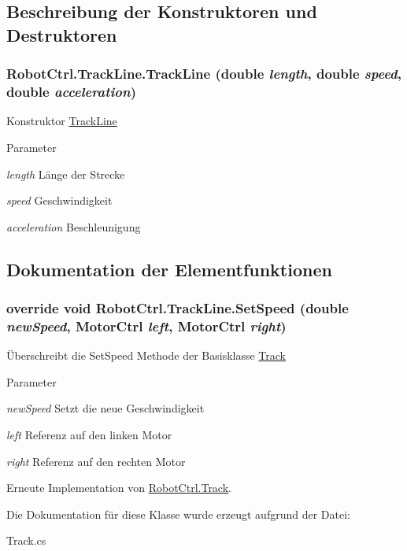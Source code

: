 \subsection{Beschreibung der Konstruktoren und Destruktoren}
\hypertarget{class_robot_ctrl_1_1_track_line_ab4ab93433f36792a4748322b94febfc7}{
\subsubsection[{TrackLine}]{\setlength{\rightskip}{0pt plus 5cm}RobotCtrl.TrackLine.TrackLine (double {\em length}, \/  double {\em speed}, \/  double {\em acceleration})}}
\label{class_robot_ctrl_1_1_track_line_ab4ab93433f36792a4748322b94febfc7}
Konstruktor \hyperlink{class_robot_ctrl_1_1_track_line}{TrackLine}


\begin{DoxyParams}{Parameter}
\item[{\em length}]L\"{a}nge der Strecke \item[{\em speed}]Geschwindigkeit \item[{\em acceleration}]Beschleunigung \end{DoxyParams}


\subsection{Dokumentation der Elementfunktionen}
\hypertarget{class_robot_ctrl_1_1_track_line_ad73ae0e8f7aea1765834ab90f5bd6b23}{
\subsubsection[{SetSpeed}]{\setlength{\rightskip}{0pt plus 5cm}override void RobotCtrl.TrackLine.SetSpeed (double {\em newSpeed}, \/  {\bf MotorCtrl} {\em left}, \/  {\bf MotorCtrl} {\em right})}}
\label{class_robot_ctrl_1_1_track_line_ad73ae0e8f7aea1765834ab90f5bd6b23}
\"{U}berschreibt die SetSpeed Methode der Basisklasse \hyperlink{class_robot_ctrl_1_1_track}{Track}


\begin{DoxyParams}{Parameter}
\item[{\em newSpeed}]Setzt die neue Geschwindigkeit \item[{\em left}]Referenz auf den linken Motor \item[{\em right}]Referenz auf den rechten Motor \end{DoxyParams}


Erneute Implementation von \hyperlink{class_robot_ctrl_1_1_track_a9abc3ccf4bf1d9db8d461f2cb4b4b0d3}{RobotCtrl.Track}.



Die Dokumentation für diese Klasse wurde erzeugt aufgrund der Datei:\begin{DoxyCompactItemize}
\item 
Track.cs\end{DoxyCompactItemize}
